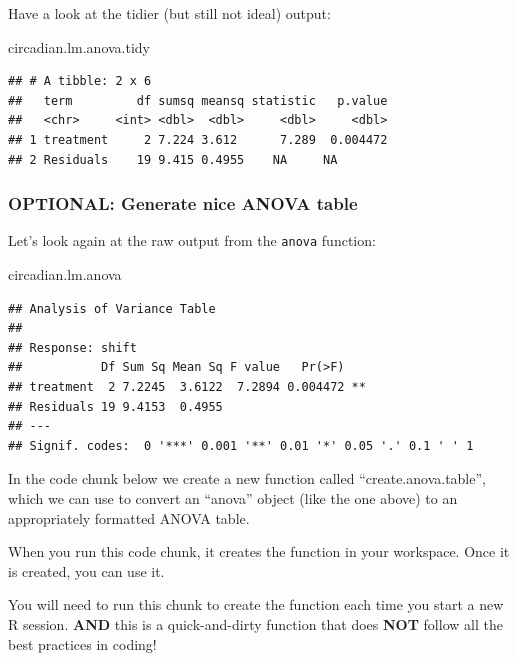 \documentclass[
]{book}
\newenvironment{Shaded}{\begin{snugshade}}{\end{snugshade}}
\newcommand{\NormalTok}[1]{#1}
\begin{document}
Have a look at the tidier (but still not ideal) output:

\begin{Shaded}
\begin{Highlighting}[]
\NormalTok{circadian.lm.anova.tidy}
\end{Highlighting}
\end{Shaded}

\begin{verbatim}
## # A tibble: 2 x 6
##   term         df sumsq meansq statistic   p.value
##   <chr>     <int> <dbl>  <dbl>     <dbl>     <dbl>
## 1 treatment     2 7.224 3.612      7.289  0.004472
## 2 Residuals    19 9.415 0.4955    NA     NA
\end{verbatim}

\subsubsection{OPTIONAL: Generate nice ANOVA table}\label{createanovatable}

Let's look again at the raw output from the \texttt{anova} function:

\begin{Shaded}
\begin{Highlighting}[]
\NormalTok{circadian.lm.anova}
\end{Highlighting}
\end{Shaded}

\begin{verbatim}
## Analysis of Variance Table
## 
## Response: shift
##           Df Sum Sq Mean Sq F value   Pr(>F)   
## treatment  2 7.2245  3.6122  7.2894 0.004472 **
## Residuals 19 9.4153  0.4955                    
## ---
## Signif. codes:  0 '***' 0.001 '**' 0.01 '*' 0.05 '.' 0.1 ' ' 1
\end{verbatim}

In the code chunk below we create a new function called ``create.anova.table'', which we can use to convert an ``anova'' object (like the one above) to an appropriately formatted ANOVA table.

When you run this code chunk, it creates the function in your workspace. Once it is created, you can use it.

You will need to run this chunk to create the function each time you start a new R session.
\textbf{AND} this is a quick-and-dirty function that does \textbf{NOT} follow all the best practices in coding!
\end{document}
